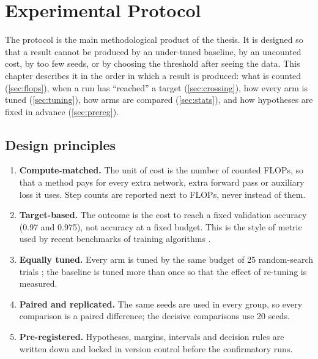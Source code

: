 \chapter{Experimental Protocol}\label{ch:protocol}

The protocol is the main methodological product of the thesis. It is designed so that a result cannot be produced by an under-tuned baseline, by an uncounted cost, by too few seeds, or by choosing the threshold after seeing the data. This chapter describes it in the order in which a result is produced: what is counted (\cref{sec:flops}), when a run has ``reached'' a target (\cref{sec:crossing}), how every arm is tuned (\cref{sec:tuning}), how arms are compared (\cref{sec:stats}), and how hypotheses are fixed in advance (\cref{sec:prereg}).

\section{Design principles}
\begin{enumerate}
\item \textbf{Compute-matched.} The unit of cost is the number of counted FLOPs, so that a method pays for every extra network, extra forward pass or auxiliary loss it uses. Step counts are reported next to FLOPs, never instead of them.
\item \textbf{Target-based.} The outcome is the cost to reach a fixed validation accuracy (0.97 and 0.975), not accuracy at a fixed budget. This is the style of metric used by recent benchmarks of training algorithms \citep{dahl2023benchmarking}.
\item \textbf{Equally tuned.} Every arm is tuned by the same budget of 25 random-search trials \citep{bergstra2012random}; the baseline is tuned more than once so that the effect of re-tuning is measured.
\item \textbf{Paired and replicated.} The same seeds are used in every group, so every comparison is a paired difference; the decisive comparisons use 20 seeds.
\item \textbf{Pre-registered.} Hypotheses, margins, intervals and decision rules are written down and locked in version control before the confirmatory runs.
\end{enumerate}

